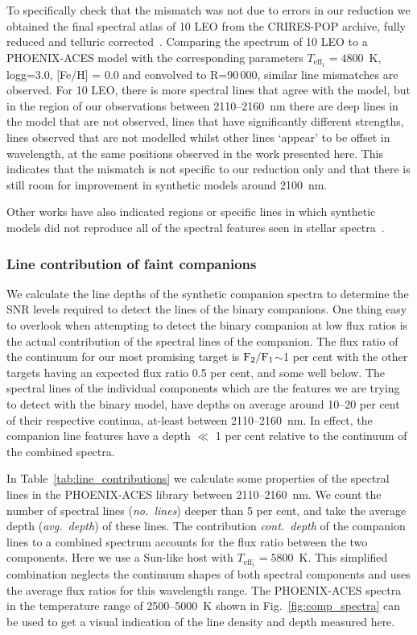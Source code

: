 \documentclass[fleqn,usenatbib]{mnras}
\begin{document}
{To specifically check that the mismatch was not due to errors in our reduction we obtained the final spectral atlas of {10 LEO} from the CRIRES-POP archive, fully reduced and telluric corrected~\citep{nicholls_crirespop_2017}. Comparing the spectrum of {10 LEO} to a PHOENIX-ACES model with the corresponding parameters \(T_{\textrm{eff}_1}=4800\)~K, logg=3.0, [Fe/H] = 0.0 and convolved to R=90\,000,  similar line mismatches are observed. For 10 LEO, there is more spectral lines that agree with the model, but in the region of our observations between 2110--2160~nm there are deep lines in the model that are not observed, lines that have significantly different strengths, lines observed that are not modelled whilst other lines `appear' to be offset in wavelength, at the same positions observed in the work presented here. This indicates that the mismatch is not specific to our reduction only and that there is still room for improvement in synthetic models around 2100~nm.}

{Other works have also indicated regions or specific lines in which synthetic models did not reproduce all of the spectral features seen in stellar spectra~\citep[e.g.][]{delburgo_physical_2009, bonnefoy_library_2014, passegger_spectroscopic_2016, rajpurohit_spectral_2016}.}

\subsubsection{Line contribution of faint companions}
\label{subsubsec:line_contributions}
We calculate the line depths of the synthetic companion spectra to determine the SNR levels required to detect the lines of the binary companions.
One thing easy to overlook when attempting to detect the binary companion at low flux ratios is the actual contribution of the spectral lines of the companion.
The flux ratio of the continuum for our most promising target is \(\rm F_2/F_1\)\(\sim\)1 per cent with the other targets having an expected flux ratio 0.5 per cent, and some well below. The spectral lines of the individual components which are the features we are trying to detect with the binary model, have depths on average around 10--20 per cent of their respective continua,  at-least between 2110--2160~nm. In effect, the companion line features have a depth \(\ll\) 1 per cent relative to the continuum of the combined spectra.

In Table~\ref{tab:line_contributions} we calculate some properties of the spectral lines in the PHOENIX-ACES library between 2110--2160~nm. We count the number of spectral lines (\emph{no.\ lines}) deeper than 5 per cent, and take the average depth (\emph{avg.\ depth}) of these lines. The contribution \emph{cont.\ depth} of the companion lines to a combined spectrum accounts for the flux ratio between the two components. Here we use a Sun-like host with \(T_{\textrm{eff}_1}=5800\)~K. This simplified combination neglects the continuum shapes of both spectral components and uses the average flux ratios for this wavelength range. The PHOENIX-ACES spectra in the temperature range of 2500--5000~K shown in Fig.~\ref{fig:comp_spectra} can be used to get a visual indication of the line density and depth measured here.
\end{document}
